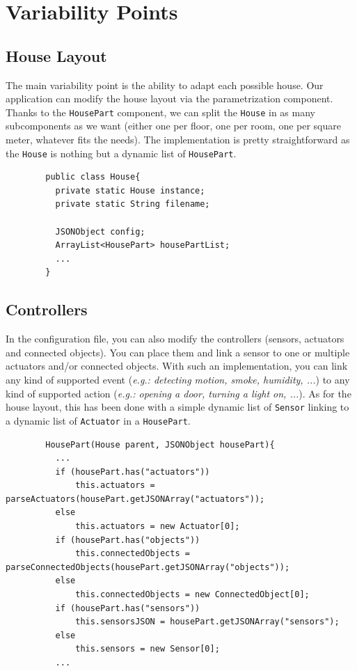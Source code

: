   \section{Variability Points}
    \subsection{House Layout}
      The main variability point is the ability to adapt each possible house. Our application can modify the house layout via the parametrization component. Thanks to the \texttt{HousePart} component, we can split the \texttt{House} in as many subcomponents as we want (either one per floor, one per room, one per square meter, whatever fits the needs). The implementation is pretty straightforward as the \texttt{House} is nothing but a dynamic list of \texttt{HousePart}.
      \begin{verbatim}
        public class House{
          private static House instance;
          private static String filename;

          JSONObject config;
          ArrayList<HousePart> housePartList;
          ...
        }
      \end{verbatim}

    \subsection{Controllers}
      In the configuration file, you can also modify the controllers (sensors, actuators and connected objects). You can place them and link a sensor to one or multiple actuators and/or connected objects. With such an implementation, you can link any kind of supported event (\emph{e.g.: detecting motion, smoke, humidity, ...}) to any kind of supported action (\emph{e.g.: opening a door, turning a light on, ...}). As for the house layout, this has been done with a simple dynamic list of \texttt{Sensor} linking to a dynamic list of \texttt{Actuator} in a \texttt{HousePart}.
      \begin{verbatim}
        HousePart(House parent, JSONObject housePart){
          ...
          if (housePart.has("actuators"))
              this.actuators = parseActuators(housePart.getJSONArray("actuators"));
          else
              this.actuators = new Actuator[0];
          if (housePart.has("objects"))
              this.connectedObjects = parseConnectedObjects(housePart.getJSONArray("objects"));
          else
              this.connectedObjects = new ConnectedObject[0];
          if (housePart.has("sensors"))
              this.sensorsJSON = housePart.getJSONArray("sensors");
          else
              this.sensors = new Sensor[0];
          ...
      \end{verbatim}

